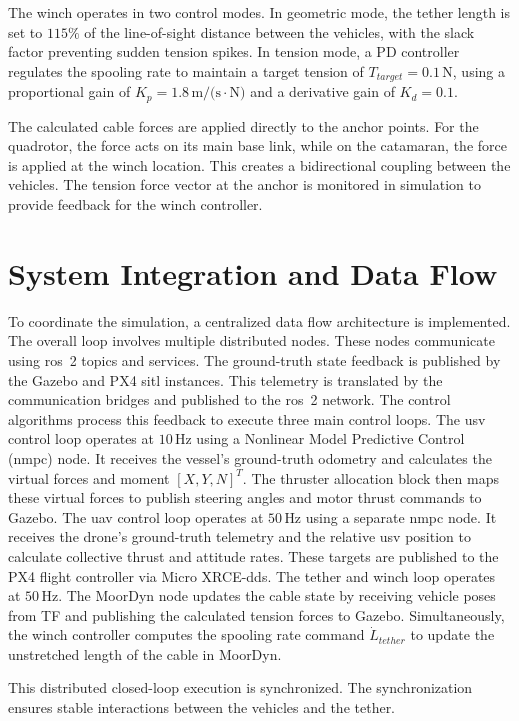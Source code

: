     The winch operates in two control modes. In geometric mode, the tether length is set to $115\%$ of the line-of-sight distance between the vehicles, with the slack factor preventing sudden tension spikes. In tension mode, a PD controller regulates the spooling rate to maintain a target tension of $T_{target} = 0.1\,\text{N}$, using a proportional gain of $K_p = 1.8\,\text{m/(s}\cdot\text{N)}$ and a derivative gain of $K_d = 0.1$.
    
    The calculated cable forces are applied directly to the anchor points. For the quadrotor, the force acts on its main base link, while on the catamaran, the force is applied at the winch location. This creates a bidirectional coupling between the vehicles. The tension force vector at the anchor is monitored in simulation to provide feedback for the winch controller.

\section{System Integration and Data Flow}
\label{sec:system_data_flow}

To coordinate the simulation, a centralized data flow architecture is implemented. The overall loop involves multiple distributed nodes. These nodes communicate using \gls{ros}~2 topics and services. The ground-truth state feedback is published by the Gazebo and PX4 \gls{sitl} instances. This telemetry is translated by the communication bridges and published to the \gls{ros}~2 network.
The control algorithms process this feedback to execute three main control loops. The \gls{usv} control loop operates at $10\,\text{Hz}$ using a Nonlinear Model Predictive Control (\gls{nmpc}) node. It receives the vessel's ground-truth odometry and calculates the virtual forces and moment $[X, Y, N]^T$. The thruster allocation block then maps these virtual forces to publish steering angles and motor thrust commands to Gazebo. The \gls{uav} control loop operates at $50\,\text{Hz}$ using a separate \gls{nmpc} node. It receives the drone's ground-truth telemetry and the relative \gls{usv} position to calculate collective thrust and attitude rates. These targets are published to the PX4 flight controller via Micro XRCE-\gls{dds}. The tether and winch loop operates at $50\,\text{Hz}$. The MoorDyn node updates the cable state by receiving vehicle poses from TF and publishing the calculated tension forces to Gazebo. Simultaneously, the winch controller computes the spooling rate command $\dot{L}_{tether}$ to update the unstretched length of the cable in MoorDyn.

This distributed closed-loop execution is synchronized. The synchronization ensures stable interactions between the vehicles and the tether.
